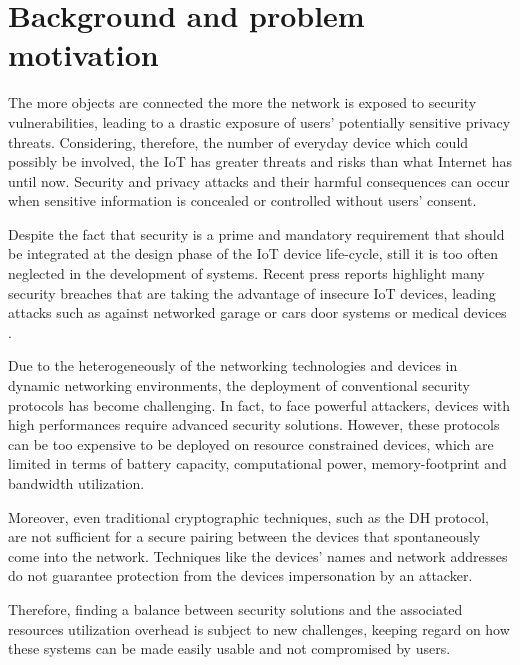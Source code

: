 \section{Background and problem motivation}
\label{sec:background}
The more objects are connected the more the network is exposed to security vulnerabilities, leading to a drastic exposure of users' potentially sensitive privacy threats.
Considering, therefore, the number of everyday device which could possibly be involved, the \acs{IoT} has greater threats and risks than what Internet has until now\cite{NationalIntelligenceCouncil1385Six2025}. 
Security and privacy attacks and their harmful consequences can occur when sensitive information is concealed or controlled without users' consent.

Despite the fact that security is a prime and mandatory requirement that should be integrated at the design phase of the \acs{IoT} device life-cycle, still it is too often neglected in the development of systems. 
Recent press reports highlight many security breaches that are taking the advantage of insecure \acs{IoT} devices, leading attacks such as against networked garage or cars  door systems \cite{Eisenbarth2008OnScheme} or medical devices \cite{Strobel2013FumingSystem}.

Due to the heterogeneously of the networking technologies and devices in dynamic networking environments, the deployment of conventional security protocols has become challenging.
In fact, to face powerful attackers, devices with high performances require advanced security solutions.
However, these protocols can be too expensive to be deployed on resource constrained devices, which are limited in terms of battery capacity, computational power, memory-footprint and bandwidth utilization.

Moreover, even traditional cryptographic techniques, such as the \ac{DH} protocol, are not sufficient for a secure pairing between the devices that spontaneously come into the network.
Techniques like the devices' names and network addresses do not guarantee protection from the devices impersonation by an attacker.

Therefore, finding a balance between security solutions and the associated resources utilization overhead is subject to new challenges, keeping regard on how these systems can be made easily usable and not compromised by users.


